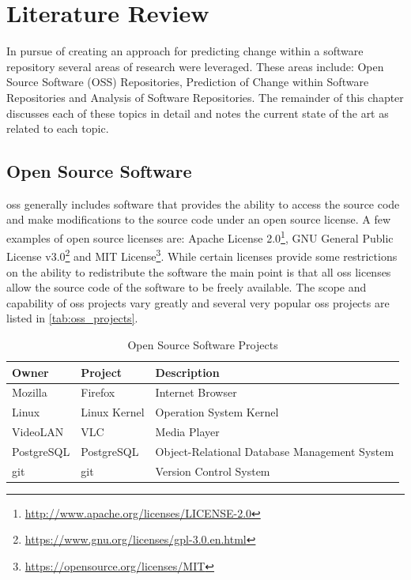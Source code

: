 \chapter{Literature Review}
\label{chap:related_works}

In pursue of creating an approach for predicting change within a software repository several areas of research were leveraged. These areas include: Open Source Software (OSS) Repositories, Prediction of Change within Software Repositories and Analysis of Software Repositories. The remainder of this chapter discusses each of these topics in detail and notes the current state of the art as related to each topic.


\section{Open Source Software}

\gls{oss} generally includes software that provides the ability to access the source code and make modifications to the source code under an open source license. A few examples of open source licenses are: Apache License 2.0\footnote{\url{http://www.apache.org/licenses/LICENSE-2.0}}, GNU General Public License v3.0\footnote{\url{https://www.gnu.org/licenses/gpl-3.0.en.html}} and MIT License\footnote{\url{https://opensource.org/licenses/MIT}}. While certain licenses provide some restrictions on the ability to redistribute the software the main point is that all \gls{oss} licenses allow the source code of the software to be freely available. The scope and capability of \gls{oss} projects vary greatly and several very popular \gls{oss} projects are listed in \autoref{tab:oss_projects}.

\begin{table}[h!]
\begin{minipage}{\textwidth}
\begin{center}
    \begin{tabular}{|l|l|l|}
        \hline
        Owner & Project & Description \\
        \hline
        Mozilla & Firefox\protect\footnotemark & Internet Browser \\
        Linux & Linux Kernel\protect\footnotemark & Operation System Kernel \\
        VideoLAN & VLC\protect\footnotemark & Media Player \\
        PostgreSQL & PostgreSQL\protect\footnotemark & Object-Relational Database Management System \\
        git & git\protect\footnotemark & Version Control System \\
        \hline
    \end{tabular}
\end{center}
\caption{Open Source Software Projects}
\label{tab:oss_projects}
\end{minipage}
\end{table}

